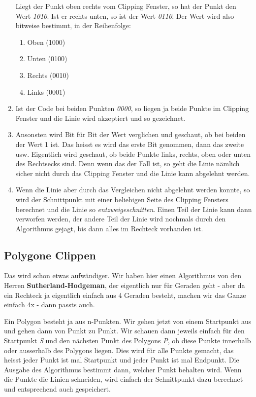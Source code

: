 \begin{enumerate}
	Liegt der Punkt oben rechts vom Clipping Fenster, so hat der Punkt den Wert \textit{1010}. Ist er rechts unten, so ist der Wert \textit{0110}. Der Wert wird also bitweise bestimmt, in der Reihenfolge:
	\begin{enumerate}
		\item Oben (1000)
		\item Unten (0100)
		\item Rechts (0010)
		\item Links (0001)
	\end{enumerate}
	\item Ist der Code bei beiden Punkten \textit{0000}, so liegen ja beide Punkte im Clipping Fenster und die Linie wird akzeptiert und so gezeichnet.
	\item Ansonsten wird Bit für Bit der Wert verglichen und geschaut, ob bei beiden der Wert 1 ist. Das heisst es wird das erste Bit genommen, dann das zweite usw. Eigentlich wird geschaut, ob beide Punkte links, rechts, oben oder unten des Rechtsecks sind. Denn wenn das der Fall ist, so geht die Linie nämlich sicher nicht durch das Clipping Fenster und die Linie kann abgelehnt werden.
	\item Wenn die Linie aber durch das Vergleichen nicht abgelehnt werden konnte, so wird der Schnittpunkt mit einer beliebigen Seite des Clipping Fensters berechnet und die Linie so \textit{entzweigeschnitten}. Einen Teil der Linie kann dann verworfen werden, der andere Teil der Linie wird nochmals durch den Algorithmus gejagt, bis dann alles im Rechteck vorhanden ist.
\end{enumerate}

\subsection{Polygone Clippen}
Das wird schon etwas aufwändiger. Wir haben hier einen Algorithmus von den Herren \textbf{Sutherland-Hodgeman}, der eigentlich nur für Geraden geht - aber da ein Rechteck ja eigentlich einfach aus 4 Geraden besteht, machen wir das Ganze einfach 4x - dann passts auch.

Ein Polygon besteht ja aus n-Punkten. Wir gehen jetzt von einem Startpunkt aus und gehen dann von Punkt zu Punkt. Wir schauen dann jeweils einfach für den Startpunkt \textit{S} und den nächsten Punkt des Polygons \textit{P}, ob diese Punkte innerhalb oder ausserhalb des Polygons liegen. Dies wird für alle Punkte gemacht, das heisst jeder Punkt ist mal Startpunkt und jeder Punkt ist mal Endpunkt. Die Ausgabe des Algorithmus bestimmt dann, welcher Punkt behalten wird. Wenn die Punkte die Linien schneiden, wird einfach der Schnittpunkt dazu berechnet und entsprechend auch gespeichert.
	
